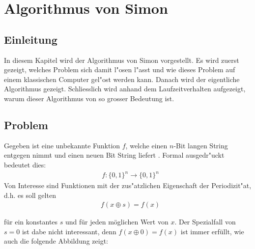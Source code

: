 \chapter{Algorithmus von Simon\label{chapter:simon}} 
\begin{refsection}

\section{Einleitung}
In diesem Kapitel wird der Algorithmus von Simon vorgestellt.  Es wird zuerst
gezeigt, welches Problem sich damit l"osen l"asst und wie dieses Problem auf
einem klassischen Computer gel"ost werden kann. Danach wird der eigentliche
Algorithmus gezeigt. Schliesslich wird anhand dem Laufzeitverhalten aufgezeigt,
warum dieser Algorithmus von so grosser Bedeutung ist.
\section{Problem}
Gegeben ist eine unbekannte Funktion $f$, welche einen $n$-Bit langen String
entgegen nimmt und einen neuen Bit String liefert
\cite{simon:cse599d-dave-bacon}. Formal ausgedr"uckt bedeutet dies:
\begin{align*}
  &f\colon\{0,1\}^n\to\{0,1\}^n
\end{align*}
Von Interesse sind Funktionen mit der zus"atzlichen Eigenschaft der
Periodizit"at, d.h. es soll gelten
\begin{align*}
  &f(x \oplus s) = f(x)
\end{align*}

für ein konstantes $s$ und für jeden möglichen Wert von $x$. 
Der Spezialfall von $s = 0$ ist dabe nicht interessant, denn $f(x \oplus 0)
= f(x)$ ist immer erfüllt, wie auch die folgende Abbildung zeigt:
\begin{figure}[H]
 \centering
\end{figure}
\end{refsection}
